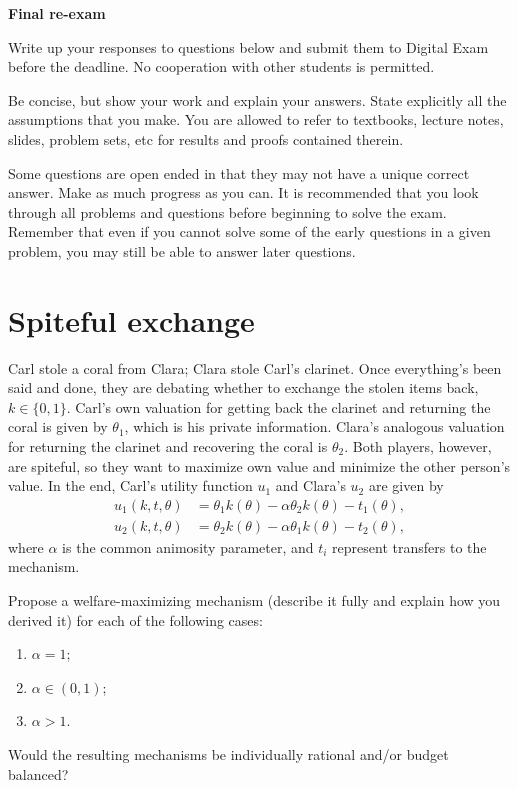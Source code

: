\documentclass[a4paper]{article}
\newif\ifsolutions
\begin{document}
{\ifsolutions \else	
	
\fi}

\begin{center}
		\LARGE\textbf{Final re-exam {\ifsolutions solutions \fi}}
\end{center}

{\ifsolutions \else	
Write up your responses to questions below and submit them to Digital Exam before the deadline. No cooperation with other students is permitted.

Be concise, but show your work and explain your answers. State explicitly all the assumptions that you make. You are allowed to refer to textbooks, lecture notes, slides, problem sets, etc for results and proofs contained therein.

Some questions are open ended in that they may not have a unique correct answer. Make as much progress as you can. It is recommended that you look through all problems and questions before beginning to solve the exam. Remember that even if you cannot solve some of the early questions in a given problem, you may still be able to answer later questions. 
\fi}




\section{Spiteful exchange}
Carl stole a coral from Clara; Clara stole Carl's clarinet. 
Once everything's been said and done, they are debating whether to exchange the stolen items back, $k \in \{0,1\}$. Carl's own valuation for getting back the clarinet and returning the coral is given by $\theta_1$, which is his private information. Clara's analogous valuation for returning the clarinet and recovering the coral is $\theta_2$. Both players, however, are spiteful, so they want to maximize own value and minimize the other person's value. In the end, Carl's utility function $u_1$ and Clara's $u_2$ are given by
\begin{align*}
	u_1(k,t,\theta) &= \theta_1 k(\theta) - \alpha \theta_2 k(\theta) - t_1(\theta),
	\\
	u_2(k,t,\theta) &= \theta_2 k(\theta) - \alpha \theta_1 k(\theta) - t_2(\theta),
\end{align*}
where $\alpha$ is the common animosity parameter, and $t_i$ represent transfers to the mechanism.

Propose a welfare-maximizing mechanism (describe it fully and explain how you derived it) for each of the following cases:
\begin{enumerate}
	\item $\alpha=1$;
	\item $\alpha \in (0,1)$;
	\item $\alpha>1$.
\end{enumerate}
Would the resulting mechanisms be individually rational and/or budget balanced?
\end{document}
